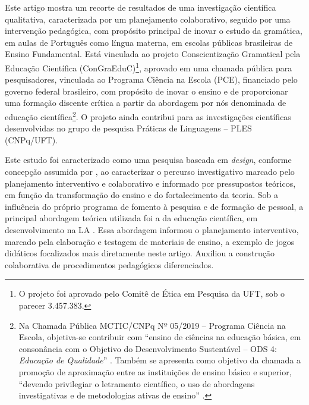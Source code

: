 Este artigo mostra um recorte de resultados de uma investigação
científica qualitativa, caracterizada por um planejamento colaborativo,
seguido por uma intervenção pedagógica, com propósito principal de
inovar o estudo da gramática, em aulas de Português como língua materna,
em escolas públicas brasileiras de Ensino Fundamental. Está vinculada ao
projeto Conscientização Gramatical pela Educação Científica
(ConGraEduC)\footnote{O projeto foi aprovado pelo Comitê de Ética em
	Pesquisa da UFT, sob o parecer 3.457.383.}, aprovado em uma chamada
pública para pesquisadores, vinculada ao Programa Ciência na Escola
(PCE), financiado pelo governo federal brasileiro, com propósito de
inovar o ensino e de proporcionar uma formação discente crítica a partir
da abordagem por nós denominada de educação científica\footnote{Na
	Chamada Pública MCTIC/CNPq Nº 05/2019 -- Programa Ciência na Escola,
	objetiva-se contribuir com ``ensino de ciências na educação básica, em
	consonância com o Objetivo do Desenvolvimento Sustentável -- ODS 4:
	\emph{Educação de Qualidade}'' \cite[1 - Objetivo]{brasil_chamada_2019}. Também se
	apresenta como objetivo da chamada a promoção de aproximação entre as
	instituições de ensino básico e superior, ``devendo privilegiar o
	letramento científico, o uso de abordagens investigativas e de
    	metodologias ativas de ensino'' \cite[item 1.1.1]{brasil_chamada_2019}.}. O projeto
ainda contribui para as investigações científicas desenvolvidas no grupo
de pesquisa Práticas de Linguagens -- PLES (CNPq/UFT).



Este estudo foi caracterizado como uma pesquisa baseada em
\emph{design}, conforme concepção assumida por \textcite{anderson_design-based_2012}, ao caracterizar o percurso investigativo marcado pelo
planejamento interventivo e colaborativo e informado por pressupostos
teóricos, em função da transformação do ensino e do fortalecimento da
teoria. Sob a influência do próprio programa de fomento à pesquisa e de
formação de pessoal, a principal abordagem teórica utilizada foi a da
educação científica, em desenvolvimento na LA \cite{freitas_educacao_2022,magalhaes_formacao_2023,silva_educacao_2020a,silva_educacao_2023}. Essa abordagem informou o
planejamento interventivo, marcado pela elaboração e testagem de
materiais de ensino, a exemplo de jogos didáticos focalizados mais
diretamente neste artigo. Auxiliou a construção colaborativa de
procedimentos pedagógicos diferenciados.

